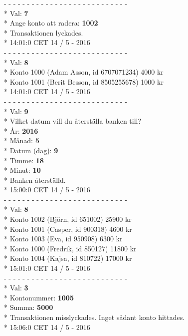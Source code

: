 \begin{multicols}{2}
- - - - - - - - - - - - - - - - - - - - - - - - - - -\\*
Val: \textbf{7}\\*
Ange konto att radera: \textbf{1002}\\*
Transaktionen lyckades.\\*
14:01:0 CET 14 / 5 - 2016\\
- - - - - - - - - - - - - - - - - - - - - - - - - - -\\*
Val: \textbf{8}\\*
Konto 1000 (Adam Asson, id 6707071234) 4000 kr\\*
Konto 1001 (Berit Besson, id 8505255678) 1000 kr\\*
14:01:0 CET 14 / 5 - 2016\\
- - - - - - - - - - - - - - - - - - - - - - - - - - -\\*
Val: \textbf{9}\\*
Vilket datum vill du återställa banken till?\\*
År: \textbf{2016}\\*
Månad: \textbf{5}\\*
Datum (dag): \textbf{9}\\*
Timme: \textbf{18}\\*
Minut: \textbf{10}\\*
Banken återställd.\\*
15:00:0 CET 14 / 5 - 2016\\
- - - - - - - - - - - - - - - - - - - - - - - - - - -\\*
Val: \textbf{8}\\*
Konto 1002 (Björn, id 651002) 25900 kr\\*
Konto 1001 (Casper, id 900318) 4600 kr\\*
Konto 1003 (Eva, id 950908) 6300 kr\\*
Konto 1000 (Fredrik, id 850127) 11800 kr\\*
Konto 1004 (Kajsa, id 810722) 17000 kr\\*
15:01:0 CET 14 / 5 - 2016\\
- - - - - - - - - - - - - - - - - - - - - - - - - - -\\*
Val: \textbf{3}\\*
Kontonummer: \textbf{1005}\\*
Summa: \textbf{5000}\\*
Transaktionen misslyckades. Inget sådant konto hittades.\\*
15:06:0 CET 14 / 5 - 2016\\
\end{multicols}
